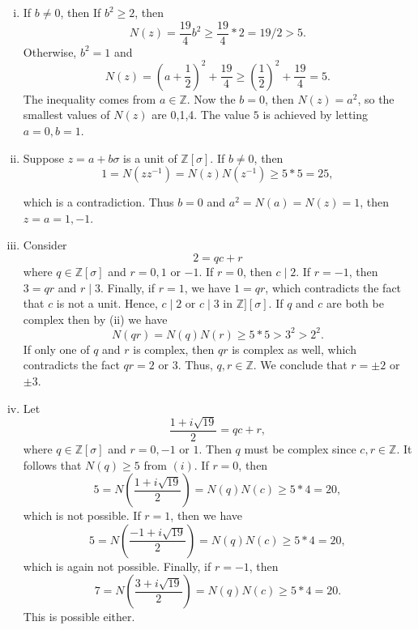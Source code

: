 \documentclass[12pt,letterpaper,boxed]{hmcpset}
\begin{document}
\begin{problem}[2.18]
    
\end{problem}
\begin{solution}
\begin{enumerate}[(i)]
    \item  If $b\neq 0$, then
%
If $b^2\geq 2$, then 
\[
N(z)=\frac{19}{4}b^2\geq\frac{19}{4}*2=19/2>5.
\]
Otherwise, $b^2=1$ and 
\[
N(z)=\left(a+\frac{1}{2}\right)^2+\frac{19}{4}\geq\left(\frac{1}{2}\right)^2+\frac{19}{4}=5. 
\]
The inequality comes from $a\in \mathbb{Z}$. Now the $b=0$, then $N(z)=a^2$, so the smallest values of $N(z)$ are 0,1,4. The value $5$ is achieved by letting $a=0, b=1$.
\item Suppose $z=a+b\sigma$ is a unit of $\mathbb{Z}[\sigma]$. If $b\neq 0$, then 
\[
1=N(zz^{-1})=N(z)N(z^{-1})\geq 5*5=25,
\]

which is a contradiction. Thus $b=0$ and $a^2=N(a)=N(z)=1$, then $z=a=1,-1$. 
\item Consider 
\[
2=qc+r
\]
where $q\in \mathbb{Z}[\sigma]$ and $r=0,1$ or $-1$. If $r=0$, then $c\mid 2$. If $r=-1$, then $3=qr$ and $r\mid 3$. Finally, if $r=1$, we have $1=qr$, which contradicts the fact that $c$ is not a unit. Hence,  $c\mid 2$ or $c\mid 3$ in $\mathbb{Z}][\sigma]$. If $q$ and $c$ are both be complex then by (ii) we have 
\[
N(qr)=N(q)N(r)\geq 5*5> 3^2>2^2.
\]
If only one of $q$ and $r$ is complex, then $qr$ is complex as well, which contradicts the fact $qr=2$ or $3$. Thus, $q,r\in\mathbb{Z}$. We conclude that $r=\pm 2$ or $\pm 3$.

\item Let 
\[
\frac{1+i\sqrt{19}}{2}=qc+r,
\]
where $q\in \mathbb{Z}[\sigma]$ and $r=0,-1$ or $1$. Then $q$ must be complex since $c,r\in \mathbb{Z}$. It follows that $N(q)\geq 5$ from $(i)$. If $r=0$, then 
\[
5=N\left(\frac{1+i\sqrt{19}}{2}\right) = N(q)N(c)\geq5*4=20,
\]
which is not possible. If $r=1$, then we have 
\[
5=N\left(\frac{-1+i\sqrt{19}}{2}\right) = N(q)N(c)\geq5*4=20,
\]
which is again not possible. Finally, if $r=-1$, then 
\[
7=N\left(\frac{3+i\sqrt{19}}{2}\right) = N(q)N(c)\geq5*4=20.
\]
This is possible either. 
\end{enumerate}
\end{solution}
\end{document}

